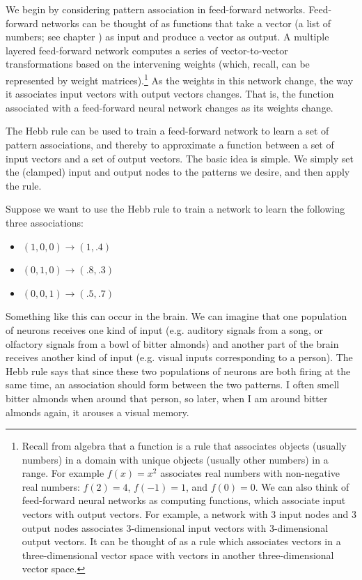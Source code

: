 
We begin by considering pattern association in feed-forward networks. Feed-forward networks can be thought of as functions that take a vector (a list of numbers; see chapter ) as input and produce a vector as output. A multiple layered feed-forward network computes a series of vector-to-vector transformations based on the intervening weights (which, recall, can be represented by weight matrices).\footnote{Recall from algebra that a function is a rule that associates objects (usually numbers) in a domain with unique objects (usually other numbers) in a range. For example $f(x) = x^2$ associates real numbers with non-negative real numbers: $f(2) = 4$, $f(-1) = 1$, and $f(0) = 0$. We can also think of feed-forward neural networks as  computing functions, which associate input vectors with output vectors. For example, a network with 3 input nodes and 3 output nodes associates 3-dimensional input vectors with 3-dimensional output vectors. It can be thought of as a rule which associates vectors in a three-dimensional vector space with vectors in another three-dimensional vector space.} As the weights in this network change, the way it associates input vectors with output vectors changes. That is, the function associated with a feed-forward neural network changes as its weights change. 

The Hebb rule can be used to train a feed-forward network to learn a set of pattern associations, and thereby to approximate a function between a set of input vectors and a set of output vectors. The basic idea is simple. We simply set the (clamped) input and output nodes to the patterns we desire, and then apply the rule. 

Suppose we want to use the Hebb rule to train a network to learn the following three associations:
\begin{itemize}
\item $(1,0,0) \rightarrow (1,.4)$
\item $(0,1,0) \rightarrow (.8,.3)$
\item $(0,0,1) \rightarrow (.5,.7)$
\end{itemize}

Something like this can occur in the brain. We can imagine that one population of neurons receives one kind of input (e.g. auditory signals from a song, or olfactory signals from a bowl of bitter almonds) and another part of the brain receives another kind of input (e.g. visual inputs corresponding to a person). The Hebb rule says that since these two populations of neurons are both firing at the same time, an association should form between the two patterns. I often smell bitter almonds when around that person, so later, when I am around bitter almonds again, it arouses a visual memory.


